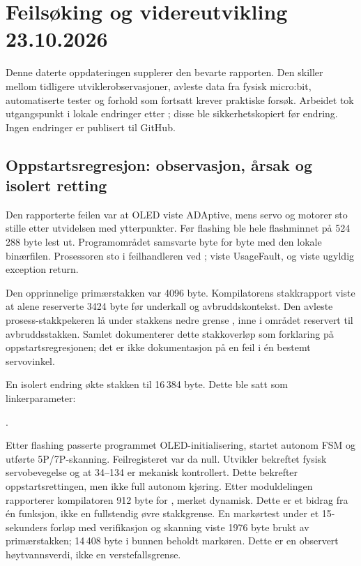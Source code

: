 \clearpage
\section{Feilsøking og videreutvikling 23.10.2026}\label{sec:utvikling23}
Denne daterte oppdateringen supplerer den bevarte rapporten. Den skiller
mellom tidligere utviklerobservasjoner, avleste data fra fysisk micro:bit,
automatiserte tester og forhold som fortsatt krever praktiske forsøk.
Arbeidet tok utgangspunkt i lokale endringer etter ; disse
ble sikkerhetskopiert før endring. Ingen endringer er publisert til GitHub.

\subsection{Oppstartsregresjon: observasjon, årsak og isolert retting}
Den rapporterte feilen var at OLED viste ADAptive, mens servo og motorer
sto stille etter utvidelsen med ytterpunkter. Før flashing ble hele
flashminnet på 524\,288 byte lest ut. Programområdet samsvarte byte for
byte med den lokale binærfilen. Prosessoren sto i feilhandleren ved
;  viste UsageFault, og
 viste ugyldig exception return.

Den opprinnelige primærstakken var 4096 byte. Kompilatorens stakkrapport
viste at  alene reserverte 3424 byte før underkall og
avbruddskontekst. Den avleste prosess-stakkpekeren
 lå under stakkens nedre grense ,
inne i området reservert til avbruddsstakken. Samlet dokumenterer dette
stakkoverløp som forklaring på oppstartsregresjonen; det er ikke
dokumentasjon på en feil i én bestemt servovinkel.

En isolert endring økte stakken til 16\,384 byte. Dette ble satt som
linkerparameter:\par
{}.\par
Etter flashing passerte programmet
OLED-initialisering, startet autonom FSM og utførte 5P/7P-skanning.
Feilregisteret var da null. Utvikler bekreftet fysisk servobevegelse og at
34--134\textdegree{} er mekanisk kontrollert. Dette bekrefter oppstartsrettingen,
men ikke full autonom kjøring. Etter moduldelingen rapporterer kompilatoren
912 byte for , merket dynamisk. Dette er et bidrag fra én
funksjon, ikke en fullstendig øvre stakkgrense. En markørtest under et
15-sekunders forløp med verifikasjon og skanning viste 1976 byte brukt
av primærstakken; 14\,408 byte i bunnen beholdt markøren. Dette er
en observert høytvannsverdi, ikke en verstefallsgrense.

